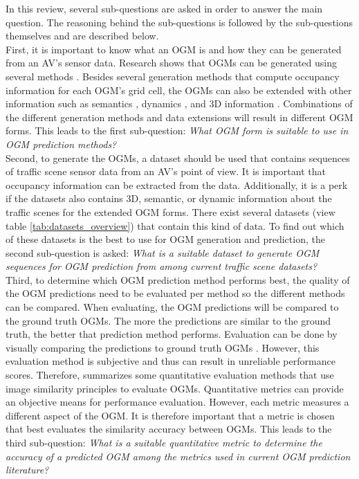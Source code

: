 In this review, several sub-questions are asked in order to answer the main question. The reasoning behind the sub-questions is followed by the sub-questions themselves and are described below. \\ 

First, it is important to know what an \gls{OGM} is and how they can be generated from an \gls{AV}'s sensor data. Research shows that \glspl{OGM} can be generated using several methods \cite{collins2007occupancy} \cite{ribo2001comparison} \cite{thrun2003learning}. Besides several generation methods that compute occupancy information for each \gls{OGM}'s grid cell, the \glspl{OGM} can also be extended with other information such as semantics \cite{lu2019monocular}, dynamics \cite{nuss2018random}, and 3D information \cite{degerman20163d}. Combinations of the different generation methods and data extensions will result in different \gls{OGM} forms. This leads to the first sub-question: \textit{What \gls{OGM} form is suitable to use in \gls{OGM} prediction methods?} \\

Second, to generate the \glspl{OGM}, a dataset should be used that contains sequences of traffic scene sensor data from an \gls{AV}'s point of view. It is important that occupancy information can be extracted from the data. Additionally, it is a perk if the datasets also contains 3D, semantic, or dynamic information about the traffic scenes for the extended \gls{OGM} forms. There exist several datasets (view table \ref{tab:datasets_overview}) that contain this kind of data. To find out which of these datasets is the best to use for \gls{OGM} generation and prediction, the second sub-question is asked: \textit{What is a suitable dataset to generate \gls{OGM} sequences for \gls{OGM} prediction from among current traffic scene datasets?} \\

Third, to determine which \gls{OGM} prediction method performs best, the quality of the \gls{OGM} predictions need to be evaluated per method so the different methods can be compared. When evaluating, the \gls{OGM} predictions will be compared to the ground truth \glspl{OGM}. The more the predictions are similar to the ground truth, the better that prediction method performs. Evaluation can be done by visually comparing the predictions to ground truth \glspl{OGM} \cite{ribo2001comparison}. However, this evaluation method is subjective and thus can result in unreliable performance scores. Therefore, \cite{collins2007occupancy} summarizes some quantitative evaluation methods that use image similarity principles to evaluate \glspl{OGM}. Quantitative metrics can provide an objective means for performance evaluation. However, each metric measures a different aspect of the \gls{OGM}. It is therefore important that a metric is chosen that best evaluates the similarity accuracy between \glspl{OGM}. This leads to the third sub-question: \textit{What is a suitable quantitative metric to determine the accuracy of a predicted \gls{OGM} among the metrics used in current \gls{OGM} prediction literature?} \\

